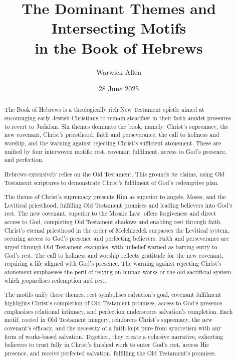 \documentclass[12pt]{article}
\title{The Dominant Themes and Intersecting Motifs \\ in the Book of Hebrews}
\author{Warwick Allen}
\date{28 June 2025}
\begin{document}
\maketitle

\begin{abstract}
The Book of Hebrews is a theologically rich New Testament epistle aimed at
encouraging early Jewish Christians to remain steadfast in their faith amidst
pressures to revert to Judaism.
%
Six themes dominate the book, namely: Christ’s supremacy, the new covenant,
Christ’s priesthood, faith and perseverance, the call to holiness and worship,
and the warning against rejecting Christ’s sufficient atonement.
%
These are unified by four interwoven motifs: rest, covenant fulfilment, access
to God’s presence, and perfection.

Hebrews extensively relies on the Old Testament.
%
This grounds its claims, using Old Testament scriptures to demonstrate Christ’s
fulfilment of God’s redemptive plan.

The theme of Christ’s supremacy presents Him as superior to angels, Moses, and
the Levitical priesthood, fulfilling Old Testament promises and leading
believers into God’s rest. The new covenant, superior to the Mosaic Law, offers
forgiveness and direct access to God, completing Old Testament shadows and
enabling rest through faith. Christ’s eternal priesthood in the order of
Melchizedek surpasses the Levitical system, securing access to God’s presence
and perfecting believers. Faith and perseverance are urged through Old
Testament examples, with unbelief warned as barring entry to God’s rest. The
call to holiness and worship reflects gratitude for the new covenant, requiring
a life aligned with God’s presence. The warning against rejecting Christ’s
atonement emphasises the peril of relying on human works or the old sacrificial
system, which jeopardises redemption and rest.

The motifs unify these themes: rest symbolises salvation’s goal, covenant
fulfilment highlights Christ’s completion of Old Testament promises, access to
God’s presence emphasises relational intimacy, and perfection underscores
salvation’s completion. Each motif, rooted in Old Testament imagery, reinforces
Christ’s supremacy, the new covenant’s efficacy, and the necessity of a faith
kept pure from syncretism with any form of works-based salvation. Together, they
create a cohesive narrative, exhorting believers to trust fully in Christ’s
finished work to enter God’s rest, access His presence, and receive perfected
salvation, fulfilling the Old Testament’s promises.
\end{abstract}
\end{document}
